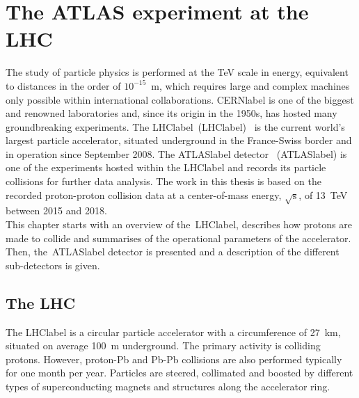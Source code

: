 \chapter{The ATLAS experiment at the LHC}
\label{chapter:ATLASLHC}

The study of particle physics is performed at the TeV scale in energy, equivalent to distances in the order of $10^{-15}$~m, which requires large and complex machines only possible within international collaborations. \acrshort{CERNlabel} is one of the biggest and renowned laboratories and, since its origin in the 1950s, has hosted many groundbreaking experiments. The \acrlong{LHClabel}~(\acrshort{LHClabel})~\cite{LHCmachine} is the current world's largest particle accelerator, situated underground in the France-Swiss border and in operation since September 2008. The \acrshort{ATLASlabel} detector~\cite{ATLASmachine} (\acrlong{ATLASlabel}) is one of the experiments hosted within the \acrshort{LHClabel} and records its particle collisions for further data analysis. The work in this thesis is based on the recorded proton-proton collision data at a center-of-mass energy, $\sqrt{\text{s}}$, of 13~TeV between 2015 and 2018.\\

This chapter starts with an overview of the~\acrshort{LHClabel}, describes how protons are made to collide and summarises of the operational parameters of the accelerator. Then, the~\acrshort{ATLASlabel} detector is presented and a description of the different sub-detectors is given.

\section{The LHC}

The \acrshort{LHClabel} is a circular particle accelerator with a circumference of 27~km, situated on average 100~m underground. The primary activity is colliding protons. However, proton-Pb and Pb-Pb collisions are also performed typically for one month per year. Particles are steered, collimated and boosted by different types of superconducting magnets and structures along the accelerator ring.\\

